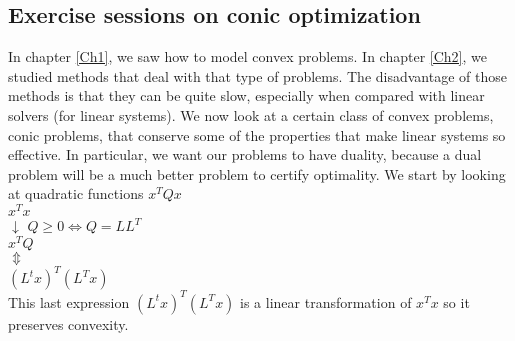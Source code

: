 %
%
%
%
%


\subsection{Exercise sessions on conic optimization}

In chapter \ref{Ch1}, we saw how to model convex problems. In chapter \ref{Ch2}, we studied methods that deal with that type of problems. The disadvantage of those methods is that they can be quite slow, especially when compared with linear solvers (for linear systems). We now look at a certain class of convex problems, conic problems, that conserve some of the properties that make linear systems so effective. In particular, we want our problems to have duality, because a dual problem will be a much better problem to certify optimality. We start by looking at quadratic functions $x^TQx$ \\

\noindent $x^Tx$\\
$\downarrow$ \qquad $Q \geq 0 \Longleftrightarrow Q=LL^T$ \\
$x^TQ$ \\
$\Updownarrow$ \\
$(L^tx)^T(L^Tx)$\\

This last expression $(L^tx)^T(L^Tx)$ is a linear transformation of $x^Tx$ so it preserves convexity.\\

